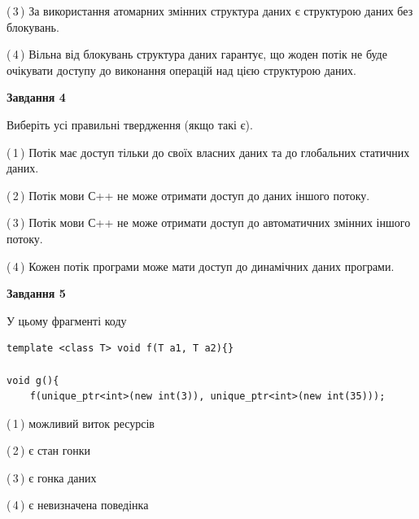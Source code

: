 \documentclass[12pt, ukrainian]{article}
\begin{document}
\begin {large}
{(\,3\,) За використання атомарних змінних структура даних є структурою даних без блокувань.%

(\,4\,) Вільна від блокувань структура даних гарантує, що жоден потік не буде очікувати доступу до виконання операцій над цією структурою даних.%



\begin{center}
\textbf{Завдання 4}
\end{center}
Виберіть усі правильні твердження (якщо такі є).\par
\vspace{2mm}

(\,1\,) Потік має доступ тільки до своїх власних даних та до глобальних статичних даних.%

(\,2\,) Потік мови С++ не може отримати доступ до даних іншого потоку.%

(\,3\,) Потік мови С++ не може отримати доступ до автоматичних змінних іншого потоку.%

(\,4\,) Кожен потік програми може мати доступ до динамічних даних програми.%



\begin{center}
\textbf{Завдання 5}
\end{center}
У цьому фрагменті коду
\begin{verbatim}
template <class T> void f(T a1, T a2){}

void g(){
    f(unique_ptr<int>(new int(3)), unique_ptr<int>(new int(35)));
\end{verbatim}

(\,1\,) можливий виток ресурсів%

(\,2\,) є стан гонки%

(\,3\,) є гонка даних%

(\,4\,) є невизначена поведінка%


}
\end {large}
\end{document}
